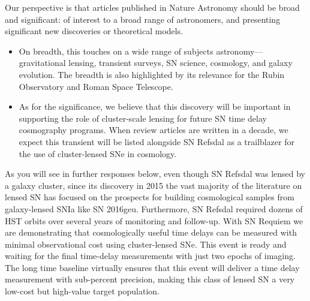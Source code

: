 \documentclass[11pt]{article}
\begin{document}
{Our perspective is that articles published in Nature Astronomy should be broad and significant: of interest to a broad range of astronomers, and presenting significant new discoveries or theoretical models.
\begin{itemize}
\item On breadth, this touches on a wide range of subjects astronomy—gravitational lensing, transient surveys, SN science, cosmology, and galaxy evolution.  The breadth is also highlighted by its relevance for the Rubin Observatory and Roman Space Telescope. 
\item  As for the significance, we believe that this discovery will be important in supporting the role of cluster-scale lensing for future SN time delay cosmography programs.  When review articles are written in a decade, we expect this transient will be listed alongside SN Refsdal as a trailblazer for the use of cluster-lensed SNe in cosmology.
\end{itemize}
As you will see in further responses below, even though SN Refsdal was lensed by a galaxy cluster, since its discovery in 2015 the vast majority of the literature on lensed SN has focused on the prospects for building cosmological samples from galaxy-lensed SNIa like SN 2016geu. Furthermore, SN Refsdal required dozens of HST orbits over several years of monitoring and follow-up. With SN Requiem we are demonstrating that cosmologically useful time delays can be measured with minimal observational cost using cluster-lensed SNe. This event is ready and waiting for the final time-delay measurements with just two epochs of imaging. The long time baseline virtually ensures that this event will deliver a time delay measurement with sub-percent precision, making this class of lensed SN a very low-cost but high-value target population.}
\end{document}
